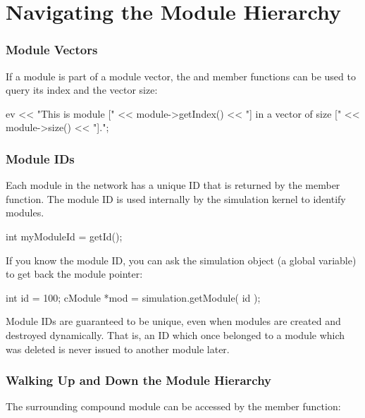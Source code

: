 \section{Navigating the Module Hierarchy}
\label{sec:simple-modules:walking-module-hierarchy}

\subsubsection{Module Vectors}


If a module is part of a module vector, the
 and  member functions can be used to
query its index and the vector size:

\begin{cpp}
ev << "This is module [" << module->getIndex() <<
      "] in a vector of size [" << module->size() << "].\n";
\end{cpp}


\subsubsection{Module IDs}


Each module in the network has a unique ID that is returned by the
 member function. The module ID is used
internally by the simulation kernel to identify modules.

\begin{cpp}
int myModuleId = getId();
\end{cpp}

If you know the module ID, you can ask the simulation object
(a global variable) to get back the module pointer:

\begin{cpp}
int id = 100;
cModule *mod = simulation.getModule( id );
\end{cpp}


Module IDs are guaranteed to be unique, even when modules are
created and destroyed dynamically. That is, an ID which once
belonged to a module which was deleted is never issued to another
module later.


\subsubsection{Walking Up and Down the Module Hierarchy}


The surrounding compound module can be accessed by the
 member function:

